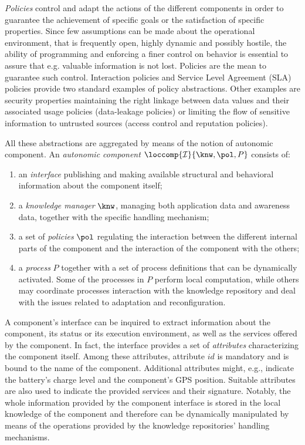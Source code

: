 \documentclass[11pt]{article}
\begin{document}
\emph{Policies} control and adapt the actions of the different components in order to guarantee the achievement of specific goals or the satisfaction of specific properties. Since few assumptions can be made about the operational environment, that is frequently open, highly dynamic and possibly hostile, the ability of programming and enforcing a finer control on behavior is essential to assure that e.g. valuable information is not lost. Policies are the mean to guarantee such control. Interaction policies and Service Level Agreement (SLA) policies provide two standard examples of policy abstractions. Other examples are security properties maintaining the right linkage between data values and their associated usage policies (data-leakage policies) or limiting the flow of sensitive information to untrusted sources (access control and reputation policies).

All these abstractions are aggregated by means of the notion of autonomic component. An \emph{autonomic component} $\loccomp{{\cal I}}{\knw,\pol,P}$ consists of:
\begin{enumerate}
\item an \emph{interface}  publishing and making available structural and behavioral information about the component itself;
\item a \emph{knowledge manager} $\knw$, managing both application data and awareness data, together with the specific handling mechanism;
\item a set of \emph{policies} $\pol$ regulating the interaction between the different internal parts of the component and the interaction of the component with the others;
\item a \emph{process} $P$ together with a set of process definitions that can be dynamically activated. Some of the processes in $P$ perform local computation, while others may coordinate processes interaction with the knowledge repository and deal with the issues related to adaptation and reconfiguration.
\end{enumerate}

A component's interface can be inquired to extract information about the component, its status or its execution environment, as well as the services offered by the component. %
In fact, the interface provides a set of \emph{attributes} characterizing the component itself. Among these attributes, attribute $id$ is mandatory and is bound to the name of the component. Additional attributes might, e.g., indicate the battery's charge level and the component's GPS position. Suitable attributes are also used to indicate the provided services and their signature.
Notably, the whole information provided by the component interface is stored in the local knowledge of the component and therefore can be dynamically manipulated by means of the operations provided by the knowledge repositories' handling mechanisms.
\end{document}
